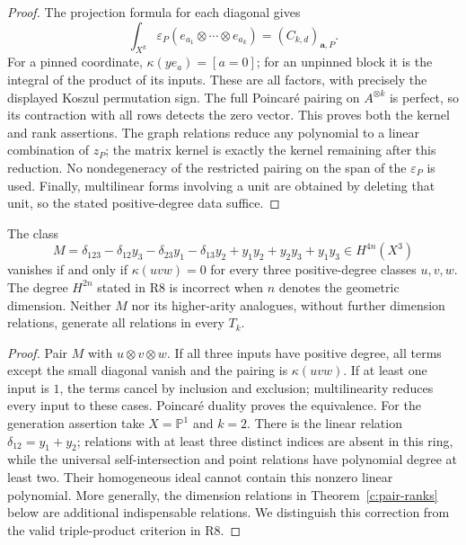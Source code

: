 \begin{proof}
The projection formula for each diagonal gives
\[
 \int_{X^k}\varepsilon_P(e_{a_1}\otimes\cdots\otimes e_{a_k})
 =(C_{k,d})_{\mathbf a,P}.
\]
For a pinned coordinate, $\kappa(ye_a)=[a=0]$; for an unpinned block it is the integral of the product of its inputs. These are all factors, with precisely the displayed Koszul permutation sign. The full Poincar\'e pairing on $A^{\otimes k}$ is perfect, so its contraction with all rows detects the zero vector. This proves both the kernel and rank assertions. The graph relations reduce any polynomial to a linear combination of $z_P$; the matrix kernel is exactly the kernel remaining after this reduction. No nondegeneracy of the restricted pairing on the span of the $\varepsilon_P$ is used. Finally, multilinear forms involving a unit are obtained by deleting that unit, so the stated positive-degree data suffice.
\end{proof}

\begin{proposition}
\label{c:modified-diagonal}
The class
\[
 M=\delta_{123}-\delta_{12}y_3-\delta_{23}y_1-\delta_{13}y_2
       +y_1y_2+y_2y_3+y_1y_3
 \in H^{4n}(X^3)
\]
vanishes if and only if $\kappa(uvw)=0$ for every three positive-degree classes $u,v,w$. The degree $H^{2n}$ stated in R8 is incorrect when $n$ denotes the geometric dimension. Neither $M$ nor its higher-arity analogues, without further dimension relations, generate all relations in every $T_k$.
\end{proposition}

\begin{proof}
Pair $M$ with $u\otimes v\otimes w$. If all three inputs have positive degree, all terms except the small diagonal vanish and the pairing is $\kappa(uvw)$. If at least one input is $1$, the terms cancel by inclusion and exclusion; multilinearity reduces every input to these cases. Poincar\'e duality proves the equivalence. For the generation assertion take $X=\mathbb P^1$ and $k=2$. There is the linear relation $\delta_{12}=y_1+y_2$; relations with at least three distinct indices are absent in this ring, while the universal self-intersection and point relations have polynomial degree at least two. Their homogeneous ideal cannot contain this nonzero linear polynomial. More generally, the dimension relations in Theorem~\ref{c:pair-ranks} below are additional indispensable relations. We distinguish this correction from the valid triple-product criterion in R8.
\end{proof}

